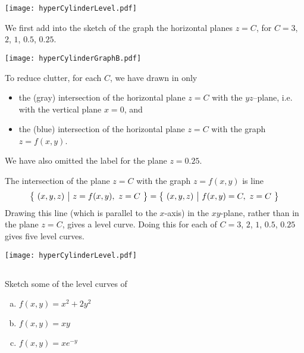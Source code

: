 \begin{answer}
\begin{center}
  \texttt{[image: hyperCylinderLevel.pdf]}
\end{center}
\end{answer}


\begin{solution}
We first add into the sketch of the graph the horizontal planes $z=C$,
for $C=3$, $2$, $1$, $0.5$, $0.25$. 
\begin{center}
  \texttt{[image: hyperCylinderGraphB.pdf]}
\end{center}
To reduce clutter, for each $C$, we have drawn in only 
\begin{itemize}
\item 
the (gray) intersection of the horizontal plane $z=C$ with the $yz$--plane,
i.e. with the vertical plane $x=0$, and
\item
the (blue) intersection of the horizontal plane $z=C$ with the graph $z=f(x,y)$.
\end{itemize} 
We have also omitted the label for the plane $z=0.25$.

The intersection of the plane $z=C$ with the graph $z=f(x,y)$ is line
\begin{equation*}
\big\{ \ (x,y,z)\ \big|\ z=f(x,y),\ z=C\ \big\} =  \big\{ \ (x,y,z)\ \big|\ f(x,y)=C,\ z=C\ \big\}
\end{equation*}
Drawing this line (which is parallel to the $x$-axis) in the $xy$-plane,
rather than in the plane $z=C$, gives a level curve. Doing this for each of
$C=3$, $2$, $1$, $0.5$, $0.25$ gives five level curves. 
\begin{center}
  \texttt{[image: hyperCylinderLevel.pdf]}
\end{center}

\end{solution}


\subsection*{\Procedural}

\begin{question}
Sketch some of the level curves of
\begin{enumerate}[(a)]
\item $f(x,y)=x^2+2y^2$
\item $f(x,y)=xy$
\item $f(x,y)=xe^{-y}$
\end{enumerate}

\end{question}


